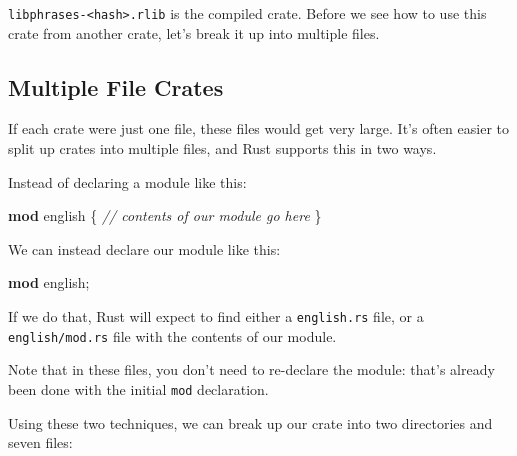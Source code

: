 \documentclass[a4paper,]{book}
\newenvironment{Shaded}{\begin{snugshade}}{\end{snugshade}}
\newcommand{\KeywordTok}[1]{\textcolor[rgb]{0.13,0.29,0.53}{\textbf{{#1}}}}
\newcommand{\CommentTok}[1]{\textcolor[rgb]{0.56,0.35,0.01}{\textit{{#1}}}}
\newcommand{\NormalTok}[1]{{#1}}
\begin{document}
\texttt{libphrases-\textless{}hash\textgreater{}.rlib} is the compiled
crate. Before we see how to use this crate from another crate, let's
break it up into multiple files.

\subsection{Multiple File Crates}\label{multiple-file-crates}

If each crate were just one file, these files would get very large. It's
often easier to split up crates into multiple files, and Rust supports
this in two ways.

Instead of declaring a module like this:

\begin{Shaded}
\begin{Highlighting}[]
\KeywordTok{mod} \NormalTok{english \{}
    \CommentTok{// contents of our module go here}
\NormalTok{\}}
\end{Highlighting}
\end{Shaded}

We can instead declare our module like this:

\begin{Shaded}
\begin{Highlighting}[]
\KeywordTok{mod} \NormalTok{english;}
\end{Highlighting}
\end{Shaded}

If we do that, Rust will expect to find either a \texttt{english.rs}
file, or a \texttt{english/mod.rs} file with the contents of our module.

Note that in these files, you don't need to re-declare the module:
that's already been done with the initial \texttt{mod} declaration.

Using these two techniques, we can break up our crate into two
directories and seven files:

\begin{Shaded}
\end{Shaded}
\end{document}
